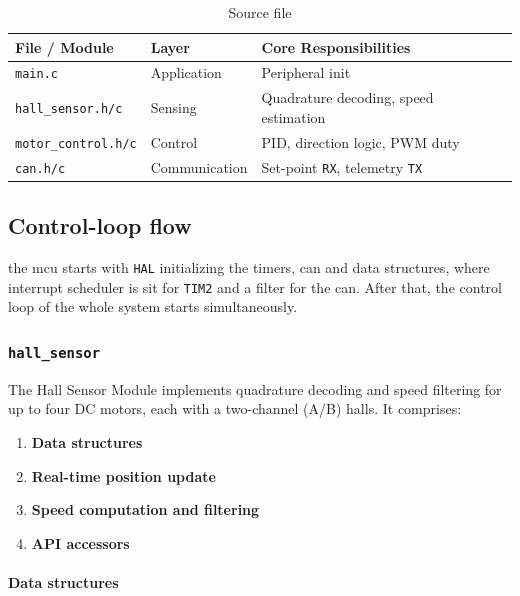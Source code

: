 \begin{table}[H]
  \centering
  \begin{tabular}{@{}llll@{}}
    \toprule
    \textbf{File / Module}      & \textbf{Layer} & \textbf{Core Responsibilities}               \\
    \midrule
    \texttt{main.c}             & Application    & Peripheral init                              \\
    \texttt{hall\_sensor.h/c}   & Sensing        & Quadrature decoding, speed estimation        \\
    \texttt{motor\_control.h/c} & Control        & PID, direction logic, PWM duty               \\
    \texttt{can.h/c}            & Communication  & Set-point \texttt{RX}, telemetry \texttt{TX} \\
    \bottomrule
  \end{tabular}
  \caption{Source file}
\end{table}

\subsection{Control-loop flow}

the \gls{mcu} starts with \texttt{HAL} initializing the timers, \gls{can} and data structures, where interrupt scheduler is sit for \texttt{TIM2} and a filter for the \gls{can}. After that, the control loop of the whole system starts simultaneously.

\subsubsection*{\texttt{hall\_sensor}}

The Hall Sensor Module implements quadrature decoding and speed filtering for up to four DC motors, each with a two-channel (A/B) \glspl{hall}. It comprises:

\begin{enumerate}
  \item \textbf{Data structures}
  \item \textbf{Real-time position update}
  \item \textbf{Speed computation and filtering}
  \item \textbf{API accessors}
\end{enumerate}

\paragraph*{Data structures}

